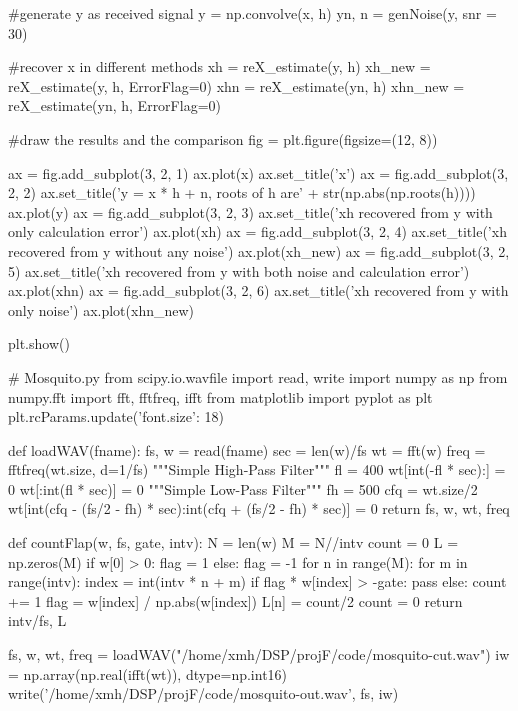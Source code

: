 \documentclass{article}
\begin{document}
\begin{appendices}
\begin{python}
#generate y as received signal
y = np.convolve(x, h)
yn, n = genNoise(y, snr = 30) 

#recover x in different methods
xh = reX_estimate(y, h)
xh_new = reX_estimate(y, h, ErrorFlag=0)
xhn = reX_estimate(yn, h)
xhn_new = reX_estimate(yn, h, ErrorFlag=0)

#draw the results and the comparison
fig = plt.figure(figsize=(12, 8))

ax = fig.add_subplot(3, 2, 1)
ax.plot(x)
ax.set_title('x')
ax = fig.add_subplot(3, 2, 2)
ax.set_title('y = x * h + n, roots of h are' + str(np.abs(np.roots(h))))
ax.plot(y)
ax = fig.add_subplot(3, 2, 3)
ax.set_title('xh recovered from y with only calculation error')
ax.plot(xh)
ax = fig.add_subplot(3, 2, 4)
ax.set_title('xh recovered from y without any noise')
ax.plot(xh_new)
ax = fig.add_subplot(3, 2, 5)
ax.set_title('xh recovered from y with both noise and calculation error')
ax.plot(xhn)
ax = fig.add_subplot(3, 2, 6)
ax.set_title('xh recovered from y with only noise')
ax.plot(xhn_new)

plt.show()

\end{python}

\begin{python}
# Mosquito.py
from scipy.io.wavfile import read, write
import numpy as np
from numpy.fft import fft, fftfreq, ifft
from matplotlib import pyplot as plt
plt.rcParams.update({'font.size': 18})

def loadWAV(fname):
    fs, w = read(fname)
    sec = len(w)/fs
    wt = fft(w)
    freq = fftfreq(wt.size, d=1/fs)
    """Simple High-Pass Filter"""
    fl = 400
    wt[int(-fl * sec):] = 0
    wt[:int(fl * sec)] = 0
    """Simple Low-Pass Filter"""
    fh = 500
    cfq = wt.size/2
    wt[int(cfq - (fs/2 - fh) * sec):int(cfq + (fs/2 - fh) * sec)] = 0
    return fs, w, wt, freq

def countFlap(w, fs, gate, intv):
    N = len(w)
    M = N//intv
    count = 0
    L = np.zeros(M)
    if w[0] > 0:
        flag = 1
    else:
        flag = -1
    for n in range(M):
        for m in range(intv):
            index = int(intv * n + m)
            if flag * w[index] > -gate:
                pass
            else:
                count += 1
                flag = w[index] / np.abs(w[index])
        L[n] = count/2
        count = 0
    return intv/fs, L

fs, w, wt, freq = loadWAV("/home/xmh/DSP/projF/code/mosquito-cut.wav")
iw = np.array(np.real(ifft(wt)), dtype=np.int16)
write('/home/xmh/DSP/projF/code/mosquito-out.wav', fs, iw)


\end{python}
\end{appendices}
\end{document}
